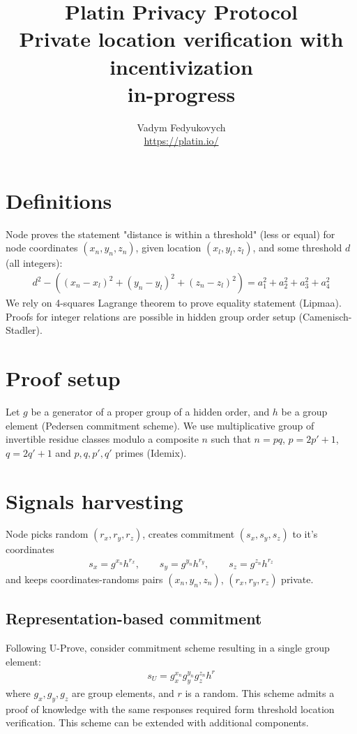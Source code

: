 \documentclass[a4paper,12pt]{article}
\author{Vadym Fedyukovych\\
  \small{
       \url{https://platin.io/}
  }
}
\title{Platin Privacy Protocol \\
  Private location verification with incentivization\\
  \small{in-progress}
}
\begin{document}
\maketitle
{}

\section{Definitions}
\label{sect-definitions}
Node proves the statement "distance is within a threshold" (less or equal)
for node coordinates $(x_n, y_n, z_n)$,
given location $(x_l, y_l, z_l)$,
and some threshold $d$ (all integers):
\begin{gather}
\label{eq-distn}
  d^2 - ((x_n - x_l)^2 + (y_n - y_l)^2 + (z_n - z_l)^2) = a_1^2 + a_2^2 + a_3^2 + a_4^2
\end{gather}
We rely on 4-squares Lagrange theorem to prove equality statement (Lipmaa).
Proofs for integer relations are possible in hidden group order setup (Camenisch-Stadler).

\section{Proof setup}

Let $g$ be a generator of a proper group of a hidden order,
and $h$ be a group element (Pedersen commitment scheme).
We use multiplicative group of invertible residue classes modulo a composite $n$ such that
$n=pq$, $p=2p'+1$, $q=2q'+1$ and $p, q, p', q'$ primes (Idemix).

\section{Signals harvesting}
Node picks random $(r_x, r_y, r_z)$, creates commitment $(s_x, s_y, s_z)$ to it's coordinates
\begin{gather}
\label{cmt-pedr}
  s_x = g^{x_n} h^{r_x},   \qquad
  s_y = g^{y_n} h^{r_y},   \qquad
  s_z = g^{z_n} h^{r_z}
\end{gather}
and keeps coordinates-randoms pairs
$(x_n, y_n, z_n)$, $(r_x, r_y, r_z)$
private.

\subsection{Representation-based commitment}
Following U-Prove, consider commitment scheme resulting in a single group element:
\begin{gather}
\label{cmt-up}
  s_U = g_x^{x_n} g_y^{y_n} g_z^{z_n} h^{r}
\end{gather}
where $g_x, g_y, g_z$ are group elements, and $r$ is a random.
This scheme admits a proof of knowledge with the same responses required form threshold location verification.
This scheme can be extended with additional components. %
\end{document}
